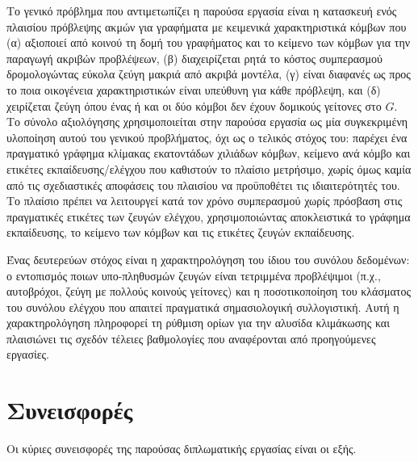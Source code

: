 Το γενικό πρόβλημα που αντιμετωπίζει η παρούσα εργασία είναι η κατασκευή ενός
πλαισίου πρόβλεψης ακμών για γραφήματα με κειμενικά χαρακτηριστικά κόμβων που (α)
αξιοποιεί από κοινού τη δομή του γραφήματος και το κείμενο των κόμβων για την
παραγωγή ακριβών προβλέψεων, (β) διαχειρίζεται ρητά το κόστος συμπερασμού
δρομολογώντας εύκολα ζεύγη μακριά από ακριβά μοντέλα, (γ) είναι διαφανές ως προς
το ποια οικογένεια χαρακτηριστικών είναι υπεύθυνη για κάθε πρόβλεψη, και (δ)
χειρίζεται ζεύγη  όπου ένας ή και οι δύο κόμβοι δεν έχουν
δομικούς γείτονες στο $G$.
Το σύνολο αξιολόγησης  χρησιμοποιείται στην παρούσα
εργασία ως μία συγκεκριμένη υλοποίηση αυτού του γενικού προβλήματος, όχι ως ο
τελικός στόχος του: παρέχει ένα πραγματικό γράφημα κλίμακας εκατοντάδων χιλιάδων
κόμβων, κείμενο ανά κόμβο και ετικέτες εκπαίδευσης/ελέγχου που καθιστούν το
πλαίσιο μετρήσιμο, χωρίς όμως καμία από τις σχεδιαστικές αποφάσεις του πλαισίου
να προϋποθέτει τις ιδιαιτερότητές του.
Το πλαίσιο πρέπει να λειτουργεί κατά τον χρόνο
συμπερασμού χωρίς πρόσβαση στις πραγματικές ετικέτες των ζευγών ελέγχου,
χρησιμοποιώντας αποκλειστικά το γράφημα εκπαίδευσης, το κείμενο των κόμβων και τις
ετικέτες ζευγών εκπαίδευσης.

Ένας δευτερεύων στόχος είναι η χαρακτηρολόγηση του ίδιου του συνόλου δεδομένων: ο
εντοπισμός ποιων υπο-πληθυσμών ζευγών είναι τετριμμένα προβλέψιμοι (π.χ., αυτοβρόχοι,
ζεύγη με πολλούς κοινούς γείτονες) και η ποσοτικοποίηση του κλάσματος του συνόλου
ελέγχου που απαιτεί πραγματικά σημασιολογική συλλογιστική.
Αυτή η χαρακτηρολόγηση
πληροφορεί τη ρύθμιση ορίων για την αλυσίδα κλιμάκωσης και πλαισιώνει τις σχεδόν
τέλειες βαθμολογίες που αναφέρονται από προηγούμενες εργασίες.


\section{Συνεισφορές}
\label{sec:contributions}

Οι κύριες συνεισφορές της παρούσας διπλωματικής εργασίας είναι οι εξής.

